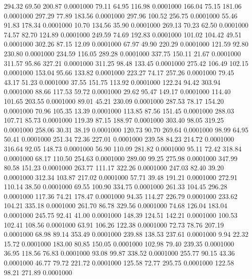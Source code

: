  294.32   69.50  200.87   0.0001000
  79.11   64.95  116.98   0.0001000
 166.04   75.15  181.06   0.0001000
 297.29   77.89  183.56   0.0001000
 297.96  100.52  256.75   0.0001000
  55.46   91.83  178.34   0.0001000
  10.70  134.56   35.90   0.0001000
 269.13   70.23   62.50   0.0001000
  74.57   82.70  124.89   0.0001000
 249.59   74.69  192.83   0.0001000
 101.02  104.42   49.51   0.0001000
 302.26   87.15   12.09   0.0001000
  67.97   49.90  220.29   0.0001000
 121.59   92.80  230.80   0.0001000
 234.59  116.05  289.28   0.0001000
 337.75  150.11   21.67   0.0001000
 311.57   95.86  327.21   0.0001000
 311.25   98.48  133.45   0.0001000
 275.42  106.49  102.15   0.0001000
 153.04   95.66  133.82   0.0001000
 223.27   74.17  257.26   0.0001000
  79.45   43.17   51.23   0.0001000
  37.55  151.75  113.92   0.0001000
 122.24   94.42  303.94   0.0001000
  88.66  117.53   59.72   0.0001000
  29.62   95.47  149.17   0.0001000
 114.40  101.65  203.55   0.0001000
  89.01   45.21  230.09   0.0001000
 287.53   78.17  154.20   0.0001000
  70.96  105.35   13.39   0.0001000
 113.85   87.56  151.45   0.0001000
 288.03  107.71   85.73   0.0001000
 119.39   87.15  188.97   0.0001000
 303.40   98.05  319.25   0.0001000
 258.06   30.31   38.19   0.0001000
 120.73   90.70  269.64   0.0001000
  98.99   64.95   50.41   0.0001000
 251.34   72.36  227.01   0.0001000
 239.58   84.23  214.72   0.0001000
 316.64   92.05  148.73   0.0001000
  56.90  110.09  281.82   0.0001000
  95.11   72.42  318.84   0.0001000
  68.17  110.50  254.63   0.0001000
 289.00   99.25  275.98   0.0001000
 347.99   80.58  151.23   0.0001000
 263.77  111.17  322.26   0.0001000
 247.03   82.40   39.20   0.0001000
 312.34  103.87  217.02   0.0001000
  57.71   39.48  191.21   0.0001000
 272.91  110.14   38.50   0.0001000
  69.55  100.90  334.75   0.0001000
 261.33  104.45  296.28   0.0001000
 117.36   74.21  178.47   0.0001000
  94.35  114.27  226.79   0.0001000
 233.62  104.21  335.18   0.0001000
 261.70   86.78  329.56   0.0001000
  74.68  126.04  183.04   0.0001000
 245.75   92.41   41.00   0.0001000
 148.39  124.51  142.21   0.0001000
 100.53  102.41  108.56   0.0001000
  63.91  106.26  122.38   0.0001000
  72.73   78.76  207.19   0.0001000
  68.98   89.14  353.49   0.0001000
 239.88  138.53  237.61   0.0001000
   9.94   22.32   15.72   0.0001000
 183.00   80.85  150.05   0.0001000
 102.98   79.40  239.35   0.0001000
  36.95  118.56   76.83   0.0001000
  93.08   99.87  338.52   0.0001000
 255.77   90.15   43.36   0.0001000
  46.77   79.72  221.72   0.0001000
 125.58   72.77  295.75   0.0001000
 122.58   98.21  271.89   0.0001000
